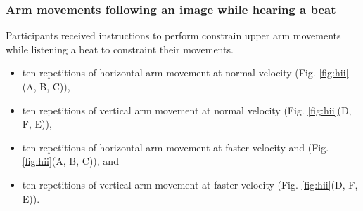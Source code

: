 \subsubsection{Arm movements following an image while hearing a beat}
Participants received instructions to perform constrain upper arm movements 
while listening a beat to constraint their movements. 
\begin{itemize}[noitemsep,topsep=0pt]
\item ten repetitions of horizontal arm movement at normal velocity
(Fig. \ref{fig:hii}(A, B, C)), 
\item ten repetitions of vertical arm movement at normal velocity
(Fig. \ref{fig:hii}(D, F, E)), 
\item ten repetitions of horizontal arm movement at faster velocity and
(Fig. \ref{fig:hii}(A, B, C)), and 
\item ten repetitions of vertical arm movement at faster velocity
(Fig. \ref{fig:hii}(D, F, E)).
\end{itemize}

